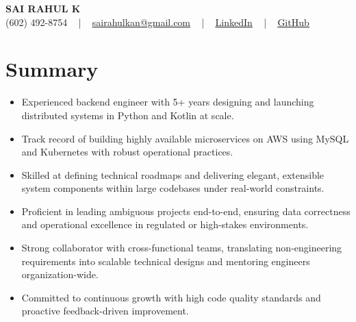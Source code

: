 \documentclass[letterpaper,11pt]{article}
\newcommand{\resumeItem}[1]{
  \item\footnotesize{
    {#1 \vspace{-2pt}}
  }
}
\newcommand{\resumeItemListStart}{\begin{itemize}[leftmargin=*]}
\newcommand{\resumeItemListEnd}{\end{itemize}\vspace{-5pt}}
\begin{document}
\begin{center}
    {\fontsize{14pt}{12pt}\selectfont \textbf{\MakeUppercase{Sai Rahul K}}}\\ \vspace{2pt}
    \fontsize{10pt}{12pt}\selectfont (602) 492-8754 ~ | ~ \href{mailto:sairahulkan@gmail.com}{sairahulkan@gmail.com} ~ | ~
    \href{https://www.linkedin.com/in/rq123/}{\color{blue}\underline{LinkedIn}} ~ | ~
    \href{https://github.com/kanrahuldo}{\color{blue}\underline{GitHub}}~
    \vspace{-8pt}
\end{center}

\section{Summary}
\fontsize{9pt}{10pt}\selectfont
\resumeItemListStart
    \resumeItem{Experienced backend engineer with 5+ years designing and launching distributed systems in Python and Kotlin at scale.}
    \resumeItem{Track record of building highly available microservices on AWS using MySQL and Kubernetes with robust operational practices.}
    \resumeItem{Skilled at defining technical roadmaps and delivering elegant, extensible system components within large codebases under real-world constraints.}
    \resumeItem{Proficient in leading ambiguous projects end-to-end, ensuring data correctness and operational excellence in regulated or high-stakes environments.}
    \resumeItem{Strong collaborator with cross-functional teams, translating non-engineering requirements into scalable technical designs and mentoring engineers organization-wide.}
    \resumeItem{Committed to continuous growth with high code quality standards and proactive feedback-driven improvement.}
\resumeItemListEnd
\vspace{-6pt}
\end{document}

